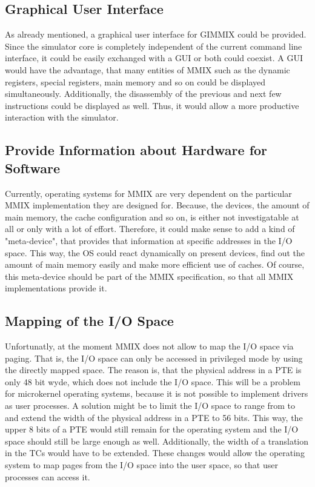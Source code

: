 \subsection{Graphical User Interface}

As already mentioned, a graphical user interface for GIMMIX could be provided. Since the simulator core is completely independent of the current command line interface, it could be easily exchanged with a GUI or both could coexist. A GUI would have the advantage, that many entities of MMIX such as the dynamic registers, special registers, main memory and so on could be displayed simultaneously. Additionally, the disassembly of the previous and next few instructions could be displayed as well. Thus, it would allow a more productive interaction with the simulator.

\subsection{Provide Information about Hardware for Software}

Currently, operating systems for MMIX are very dependent on the particular MMIX implementation they are designed for. Because, the devices, the amount of main memory, the cache configuration and so on, is either not investigatable at all or only with a lot of effort. Therefore, it could make sense to add a kind of "meta-device", that provides that information at specific addresses in the I/O space. This way, the OS could react dynamically on present devices, find out the amount of main memory easily and make more efficient use of caches. Of course, this meta-device should be part of the MMIX specification, so that all MMIX implementations provide it.

\subsection{Mapping of the I/O Space}

Unfortunatly, at the moment MMIX does not allow to map the I/O space via paging. That is, the I/O space can only be accessed in privileged mode by using the directly mapped space. The reason is, that the physical address in a PTE is only 48 bit wyde, which does not include the I/O space. This will be a problem for microkernel operating systems, because it is not possible to implement drivers as user processes. A solution might be to limit the I/O space to range from  to  and extend the width of the physical address in a PTE to 56 bits. This way, the upper 8 bits of a PTE would still remain for the operating system and the I/O space should still be large enough as well. Additionally, the width of a translation in the TCs would have to be extended. These changes would allow the operating system to map pages from the I/O space into the user space, so that user processes can access it.

